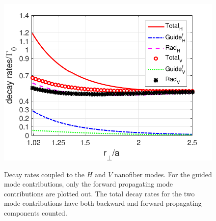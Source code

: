 \begin{figure}
\begin{minipage}{.91\linewidth}
\centering
{\includegraphics[scale=0.75]{./Figs/HVdecayrates}}
\end{minipage}
\caption{Decay rates coupled to the $ H $ and $ V $ nanofiber modes. For the guided mode contributions, only the forward propagating mode contributions are plotted out. The total decay rates for the two mode contributions have both backward and forward propagating components counted.}\label{fig:HVdecayrates}
\end{figure}

